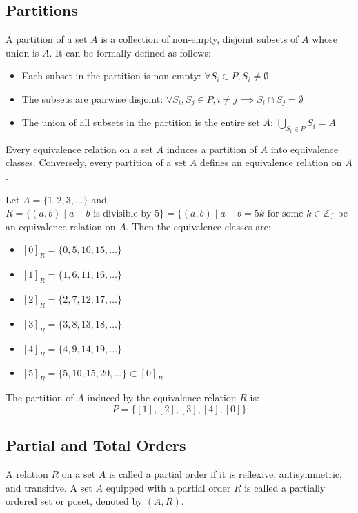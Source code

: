 \subsection{Partitions}
\begin{definition}[Partition]
    A partition of a set $A$ is a collection of non-empty, disjoint subsets of $A$ whose union is $A$. It can be formally defined as follows:
    \begin{itemize}[itemsep=1pt,label=$\circ$]
        \item Each subset in the partition is non-empty: $\forall S_i \in P, S_i \neq \emptyset$
        \item The subsets are pairwise disjoint: $\forall S_i, S_j \in P, i \neq j \implies S_i \cap S_j = \emptyset$
        \item The union of all subsets in the partition is the entire set $A$: $\bigcup_{S_i \in P} S_i = A$
    \end{itemize}
\end{definition}
Every equivalence relation on a set $A$ induces a partition of $A$ into equivalence classes. Conversely, every partition of a set $A$ defines an equivalence relation on $A$.
\begin{eg}
    Let $A = \{1, 2, 3, \ldots\}$ and $R = \{(a, b) \mid a - b \text{ is divisible by } 5\} = \{(a, b) \mid a - b = 5k \text{ for some } k \in \mathbb{Z}\}$ be an equivalence relation on $A$. Then the equivalence classes are:
    \begin{itemize}[itemsep=1pt,label=$\circ$]
        \item $[0]_R = \{0, 5, 10, 15, \ldots\}$
        \item $[1]_R = \{1, 6, 11, 16, \ldots\}$
        \item $[2]_R = \{2, 7, 12, 17, \ldots\}$
        \item $[3]_R = \{3, 8, 13, 18, \ldots\}$
        \item $[4]_R = \{4, 9, 14, 19, \ldots\}$
        \item $[5]_R = \{5, 10, 15, 20, \ldots\} \subset [0]_R$
    \end{itemize}
    The partition of $A$ induced by the equivalence relation $R$ is:
    \[ P = \{[1], [2], [3], [4], [0]\} \]
\end{eg}

\subsection{Partial and Total Orders}
\begin{definition}
    A relation $R$ on a set $A$ is called a partial order if it is reflexive, antisymmetric, and transitive. A set $A$ equipped with a partial order $R$ is called a partially ordered set or poset, denoted by $(A, R)$.
\end{definition}

